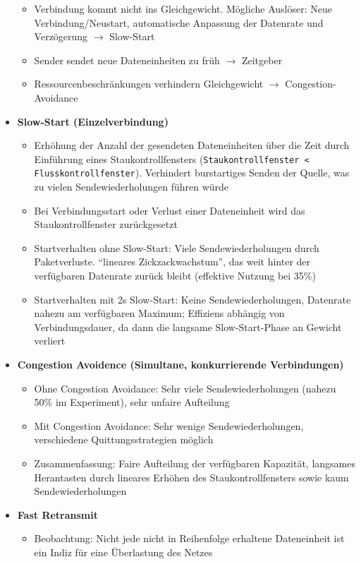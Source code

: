 \begin{itemize}
	\begin{itemize}
		\item Verbindung kommt nicht ins Gleichgewicht. Mögliche Auslöser: Neue Verbindung/Neustart, automatische Anpassung der Datenrate und Verzögerung \(\rightarrow\) Slow-Start
		\item Sender sendet neue Dateneinheiten zu früh \(\rightarrow\) Zeitgeber
		\item Ressourcenbeschränkungen verhindern Gleichgewicht \(\rightarrow\) Congestion-Avoidance
	\end{itemize}
	\item \textbf{Slow-Start (Einzelverbindung)}
	\begin{itemize}
		\item Erhöhung der Anzahl der gesendeten Dateneinheiten über die Zeit durch Einführung eines Staukontrollfensters (\texttt{Staukontrollfenster < Flusskontrollfenster}). Verhindert burstartiges Senden der Quelle, was zu vielen Sendewiederholungen führen würde
		\item Bei Verbindungsstart oder Verlust einer Dateneinheit wird das Staukontrollfenster zurückgesetzt
		\item Startverhalten ohne Slow-Start: Viele Sendewiederholungen durch Paketverluste. "`lineares Zickzackwachstum"', das weit hinter der verfügbaren Datenrate zurück bleibt (effektive Nutzung bei 35\%)
		\item Startverhalten mit 2s Slow-Start: Keine Sendewiederholungen, Datenrate nahezu am verfügbaren Maximum; Effiziens abhängig von Verbindungsdauer, da dann die langsame Slow-Start-Phase an Gewicht verliert
	\end{itemize}
	\item \textbf{Congestion Avoidence (Simultane, konkurrierende Verbindungen)}
	\begin{itemize}
		\item Ohne Congestion Avoidance: Sehr viele Sendewiederholungen (nahezu 50\% im Experiment), sehr unfaire Aufteilung
		\item Mit Congestion Avoidance: Sehr wenige Sendewiederholungen, verschiedene Quittungsstrategien möglich
		\item Zusammenfassung: Faire Aufteilung der verfügbaren Kapazität, langsames Herantasten durch lineares Erhöhen des Staukontrollfensters sowie kaum Sendewiederholungen
	\end{itemize}
	\item \textbf{Fast Retransmit}
	\begin{itemize}
		\item Beobachtung: Nicht jede nicht in Reihenfolge erhaltene Dateneinheit ist ein Indiz für eine Überlastung des Netzes

\end{itemize}
\end{itemize}

